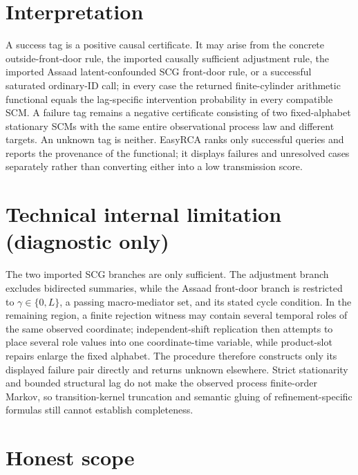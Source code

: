 \documentclass{article}
\begin{document}
\section{Interpretation}

A success tag is a positive causal certificate. It may arise from the concrete outside-front-door rule, the imported causally sufficient adjustment rule, the imported Assaad latent-confounded SCG front-door rule, or a successful saturated ordinary-ID call; in every case the returned finite-cylinder arithmetic functional equals the lag-specific intervention probability in every compatible SCM. A failure tag remains a negative certificate consisting of two fixed-alphabet stationary SCMs with the same entire observational process law and different targets. An unknown tag is neither. EasyRCA ranks only successful queries and reports the provenance of the functional; it displays failures and unresolved cases separately rather than converting either into a low transmission score.

\section*{Technical internal limitation (diagnostic only)}

The two imported SCG branches are only sufficient. The adjustment branch excludes bidirected summaries, while the Assaad front-door branch is restricted to \(\gamma\in\{0,L\}\), a passing macro-mediator set, and its stated cycle condition. In the remaining region, a finite rejection witness may contain several temporal roles of the same observed coordinate; independent-shift replication then attempts to place several role values into one coordinate-time variable, while product-slot repairs enlarge the fixed alphabet. The procedure therefore constructs only its displayed failure pair directly and returns unknown elsewhere. Strict stationarity and bounded structural lag do not make the observed process finite-order Markov, so transition-kernel truncation and semantic gluing of refinement-specific formulas still cannot establish completeness.

\section{Honest scope}
\end{document}
